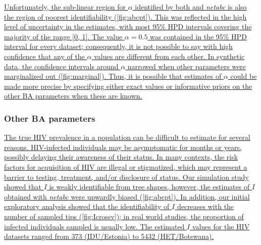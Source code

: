 \documentclass[12pt]{article}\usepackage[]{graphicx}\usepackage[]{color}
\let\mref\cref
\renewcommand{\cref}[1]{\mbox{\mref{#1}}}
\newcommand{\add}[1]{\color{blue} \uline{#1} \color{black}}
\begin{document}
\add{Unfortunately, the sub-linear region for $\alpha$ identified by both
\textcite{de2007preferential} and \textit{netabc} is also the region of
poorest identifiability (\cref{fig:abcpt}). This was reflected in the high
level of uncertainty in the estimates, with most 95\% HPD intervals covering
the majority of the range [0, 1]. The value $\alpha = 0.5$ was contained in the
95\% HPD interval for every dataset; consequently, it is not possible to say
with high confidence that any of the $\alpha$ values are different from each
other. In synthetic data, the confidence intervals around $\alpha$ narrowed
when other parameters were marginalized out (\cref{fig:marginal}). Thus, it is
possible that estimates of $\alpha$ could be made more precise by specifying
either exact values or informative priors on the other BA parameters when these
are known.}

\subsubsection*{Other BA parameters}



\add{The true HIV prevalence in a population can be difficult to estimate for
several reasons. HIV-infected individuals may be asymptomatic for months or
years, possibly delaying their awareness of their status. In many contexts, the
risk factors for acquisition of HIV are illegal or stigmatized, which may
represent a barrier to testing, treatment, and/or disclosure of status.
Our simulation study showed that $I$ is weakly identifiable from tree shapes,
however, the estimates of $I$ obtained with \textit{netabc} were upwardly
biased (\cref{fig:abcpt}). In addition, our initial exploratory analysis showed
that the identifiability of $I$ decreases with the number of sampled tips
(\cref{fig:Icrossv}); in real world studies, the proportion of infected
individuals sampled is usually low. The estimated $I$ values for the HIV
datasets ranged from
    373
    (IDU/Estonia)
to
    5432
(HET/Botswana).}
\end{document}
